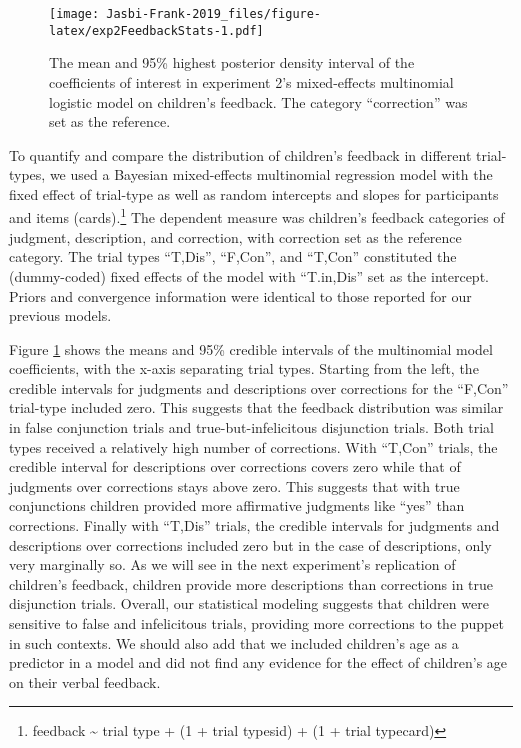 \documentclass[,man,floatsintext]{apa6}
\let\rmarkdownfootnote\footnote%
\def\footnote{\protect\rmarkdownfootnote}
\begin{document}
\begin{figure}
\centering
\texttt{[image: Jasbi-Frank-2019\_files/figure-latex/exp2FeedbackStats-1.pdf]}
\caption{\label{fig:exp2FeedbackStats}The mean and 95\% highest posterior density interval of the coefficients of interest in experiment 2's mixed-effects multinomial logistic model on children's feedback. The category \enquote{correction} was set as the reference.}
\end{figure}

To quantify and compare the distribution of children's feedback in different trial-types, we used a Bayesian mixed-effects multinomial regression model with the fixed effect of trial-type as well as random intercepts and slopes for participants and items (cards).\footnote{feedback \textasciitilde{} trial type + (1 + trial type\textbar{}sid) + (1 + trial type\textbar{}card)} The dependent measure was children's feedback categories of judgment, description, and correction, with correction set as the reference category. The trial types \enquote{T,Dis}, \enquote{F,Con}, and \enquote{T,Con} constituted the (dummy-coded) fixed effects of the model with \enquote{T.in,Dis} set as the intercept. Priors and convergence information were identical to those reported for our previous models.

Figure \ref{fig:exp2FeedbackStats} shows the means and 95\% credible intervals of the multinomial model coefficients, with the x-axis separating trial types. Starting from the left, the credible intervals for judgments and descriptions over corrections for the \enquote{F,Con} trial-type included zero. This suggests that the feedback distribution was similar in false conjunction trials and true-but-infelicitous disjunction trials. Both trial types received a relatively high number of corrections. With \enquote{T,Con} trials, the credible interval for descriptions over corrections covers zero while that of judgments over corrections stays above zero. This suggests that with true conjunctions children provided more affirmative judgments like \enquote{yes} than corrections.
Finally with \enquote{T,Dis} trials, the credible intervals for judgments and descriptions over corrections included zero but in the case of descriptions, only very marginally so. As we will see in the next experiment's replication of children's feedback, children provide more descriptions than corrections in true disjunction trials. Overall, our statistical modeling suggests that children were sensitive to false and infelicitous trials, providing more corrections to the puppet in such contexts. We should also add that we included children's age as a predictor in a model and did not find any evidence for the effect of children's age on their verbal feedback.
\end{document}

